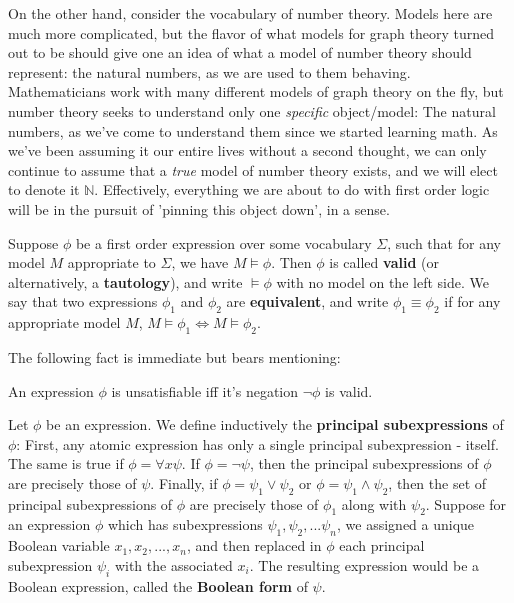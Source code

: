 \begin{example}
    On the other hand, consider the vocabulary of number theory. Models here are much more complicated, but the flavor of what models for graph theory turned out to be should give one an idea of what a model of number theory should represent: the natural numbers, as we are used to them behaving. Mathematicians work with many different models of graph theory on the fly, but number theory seeks to understand only one \textit{specific} object/model: The natural numbers, as we've come to understand them since we started learning math. As we've been assuming it our entire lives without a second thought, we can only continue to assume that a \textit{true} model of number theory exists, and we will elect to denote it $\mathbb{N}$. Effectively, everything we are about to do with first order logic will be in the pursuit of 'pinning this object down', in a sense.
\end{example}
\begin{definition}
    Suppose $\phi$ be a first order expression over some vocabulary $\Sigma$, such that for any model $M$ appropriate to  $\Sigma$, we have $M \models \phi$. Then $\phi$ is called \textbf{valid} (or alternatively, a \textbf{tautology}), and write $\models \phi$ with no model on the left side. We say that two expressions $\phi_1$ and $\phi_2$ are \textbf{equivalent}, and write $\phi_1 \equiv \phi_2$ if for any appropriate model $M$, $M \models \phi_1 \iff M \models \phi_2$. 
\end{definition}
The following fact is immediate but bears mentioning:
\begin{fact}
    An expression $\phi$ is unsatisfiable iff it's negation $\neg \phi$ is valid.
\end{fact}
\begin{definition}
    Let $\phi$ be an expression. We define inductively the \textbf{principal subexpressions} of $\phi$: First, any atomic expression has only a single principal subexpression - itself. The same is true if $\phi = \forall x \psi$. If $\phi = \neg \psi$, then the principal subexpressions of $\phi$ are precisely those of $\psi$. Finally, if $\phi = \psi_1 \vee \psi_2$ or $\phi = \psi_1 \wedge \psi_2$, then the set of principal subexpressions of $\phi$ are precisely those of $\phi_1$ along with $\psi_2$. Suppose for an expression $\phi$ which has subexpressions $\psi_1, \psi_2,... \psi_n$, we assigned a unique Boolean variable $x_1,x_2,...,x_n$, and then replaced in $\phi$ each principal subexpression $\psi_i$ with the associated $x_i$. The resulting expression would be a Boolean expression, called the \textbf{Boolean form} of $\psi$.
\end{definition}
